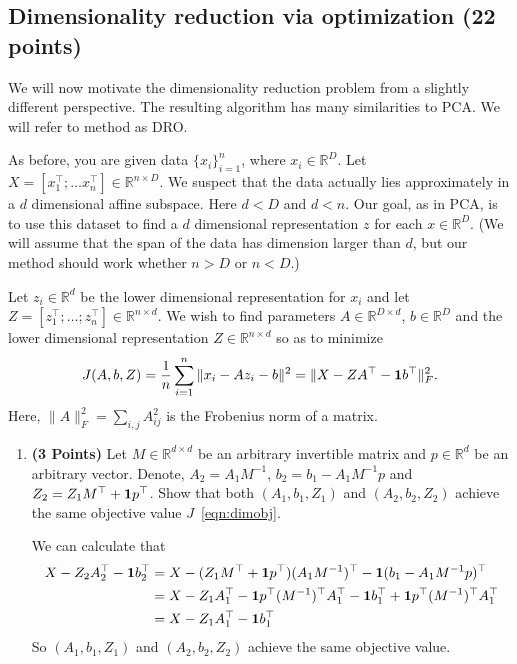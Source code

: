 \documentclass[a4paper]{article}
\newcounter{thm}
\newcommand*{\one}{{\bf 1}}
\theoremstyle{definition}
\newcommand{\RR}{\mathbb{R}}
\newenvironment{soln}{
    \leavevmode\color{blue}\ignorespaces
}{}
\begin{document}
\subsection{Dimensionality reduction via optimization (22 points)}

We will now motivate the dimensionality reduction problem from a slightly different
perspective. The resulting algorithm has many similarities to PCA.
We will refer to method as DRO.

As before, you are given data $\{x_i\}_{i=1}^n$, where $x_i \in \RR^D$. Let $X=[x_1^\top; \dots
x_n^\top] \in \RR^{n\times D}$. We suspect that the data
actually lies approximately in  a $d$ dimensional affine subspace.
Here $d<D$ and $d<n$.
Our goal, as in PCA, is to use this dataset to find a $d$ dimensional representation $z$ for each $x\in\RR^D$.
(We will assume that the span of the data has dimension larger than
$d$, but our method should work whether $n>D$ or $n<D$.)


Let $z_i\in \RR^d$ be the lower dimensional representation for $x_i$ and
let $Z = [z_1^\top; \dots; z_n^\top] \in \RR^{n\times d}$.
We wish to find parameters $A \in \RR^{D\times d}$, $b\in\RR^D$ and the lower
dimensional representation $Z\in \RR^{n\times d}$ so as to minimize
\begin{equation}
J(A,b,Z) = \frac{1}{n} \sum_{i=1}^n \|x_i - Az_i - b\|^2 = \| X - ZA^\top - \one b^\top\|_F^2.
\label{eqn:dimobj}
\end{equation}
Here, $\|A\|^2_F = \sum_{i,j} A_{ij}^2$ is the Frobenius norm of a matrix.


\begin{enumerate}
\item \textbf{(3 Points)}
Let $M\in\RR^{d\times d}$ be an arbitrary invertible matrix and $p\in\RR^{d}$ be an arbitrary vector.
Denote, $A_2 = A_1M^{-1}$, $b_2 = b_1- A_1M^{-1}p$ and $Z_2 = Z_1 M^\top +
\one p^\top$.
Show that both
        $(A_1, b_1, Z_1)$ and $(A_2, b_2, Z_2)$ achieve the same objective value $J$~\eqref{eqn:dimobj}.

        \begin{soln}
          We can calculate that
          \begin{align*}
            X - Z_{2}A_{2}^{\top}-\one b_{2}^{\top}
            &=  X - (Z_{1}M^{\top}+\one p^{\top})(A_{1}M^{-1})^{\top} - \one (b_{1}-A_{1}M^{-1}p)^{\top}\\
            &= X - Z_{1}A_{1}^{\top} - \one p^{\top} (M^{-1})^{\top} A_{1}^{\top} - \one b_{1}^{\top} + \one p^{\top}(M^{-1})^{\top}A_{1}^{\top}\\
            &= X - Z_{1}A_{1}^{\top} - \one b_{1}^{\top}
          \end{align*}
          So $(A_{1},b_{1},Z_{1})$ and $(A_{2},b_{2},Z_{2})$ achieve the same objective value.
        \end{soln}
\end{enumerate}
\end{document}
